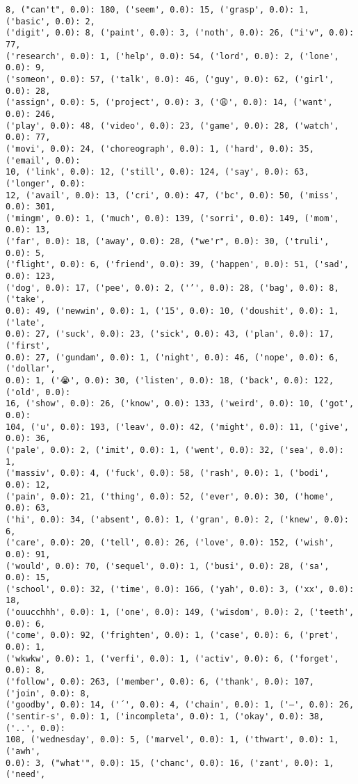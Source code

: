\documentclass[11pt]{article}
\begin{document}
\begin{Verbatim}[commandchars=\\\{\}]
8, ("can't", 0.0): 180, ('seem', 0.0): 15, ('grasp', 0.0): 1, ('basic', 0.0): 2,
('digit', 0.0): 8, ('paint', 0.0): 3, ('noth', 0.0): 26, ("i'v", 0.0): 77,
('research', 0.0): 1, ('help', 0.0): 54, ('lord', 0.0): 2, ('lone', 0.0): 9,
('someon', 0.0): 57, ('talk', 0.0): 46, ('guy', 0.0): 62, ('girl', 0.0): 28,
('assign', 0.0): 5, ('project', 0.0): 3, ('😩', 0.0): 14, ('want', 0.0): 246,
('play', 0.0): 48, ('video', 0.0): 23, ('game', 0.0): 28, ('watch', 0.0): 77,
('movi', 0.0): 24, ('choreograph', 0.0): 1, ('hard', 0.0): 35, ('email', 0.0):
10, ('link', 0.0): 12, ('still', 0.0): 124, ('say', 0.0): 63, ('longer', 0.0):
12, ('avail', 0.0): 13, ('cri', 0.0): 47, ('bc', 0.0): 50, ('miss', 0.0): 301,
('mingm', 0.0): 1, ('much', 0.0): 139, ('sorri', 0.0): 149, ('mom', 0.0): 13,
('far', 0.0): 18, ('away', 0.0): 28, ("we'r", 0.0): 30, ('truli', 0.0): 5,
('flight', 0.0): 6, ('friend', 0.0): 39, ('happen', 0.0): 51, ('sad', 0.0): 123,
('dog', 0.0): 17, ('pee', 0.0): 2, ('’', 0.0): 28, ('bag', 0.0): 8, ('take',
0.0): 49, ('newwin', 0.0): 1, ('15', 0.0): 10, ('doushit', 0.0): 1, ('late',
0.0): 27, ('suck', 0.0): 23, ('sick', 0.0): 43, ('plan', 0.0): 17, ('first',
0.0): 27, ('gundam', 0.0): 1, ('night', 0.0): 46, ('nope', 0.0): 6, ('dollar',
0.0): 1, ('😭', 0.0): 30, ('listen', 0.0): 18, ('back', 0.0): 122, ('old', 0.0):
16, ('show', 0.0): 26, ('know', 0.0): 133, ('weird', 0.0): 10, ('got', 0.0):
104, ('u', 0.0): 193, ('leav', 0.0): 42, ('might', 0.0): 11, ('give', 0.0): 36,
('pale', 0.0): 2, ('imit', 0.0): 1, ('went', 0.0): 32, ('sea', 0.0): 1,
('massiv', 0.0): 4, ('fuck', 0.0): 58, ('rash', 0.0): 1, ('bodi', 0.0): 12,
('pain', 0.0): 21, ('thing', 0.0): 52, ('ever', 0.0): 30, ('home', 0.0): 63,
('hi', 0.0): 34, ('absent', 0.0): 1, ('gran', 0.0): 2, ('knew', 0.0): 6,
('care', 0.0): 20, ('tell', 0.0): 26, ('love', 0.0): 152, ('wish', 0.0): 91,
('would', 0.0): 70, ('sequel', 0.0): 1, ('busi', 0.0): 28, ('sa', 0.0): 15,
('school', 0.0): 32, ('time', 0.0): 166, ('yah', 0.0): 3, ('xx', 0.0): 18,
('ouucchhh', 0.0): 1, ('one', 0.0): 149, ('wisdom', 0.0): 2, ('teeth', 0.0): 6,
('come', 0.0): 92, ('frighten', 0.0): 1, ('case', 0.0): 6, ('pret', 0.0): 1,
('wkwkw', 0.0): 1, ('verfi', 0.0): 1, ('activ', 0.0): 6, ('forget', 0.0): 8,
('follow', 0.0): 263, ('member', 0.0): 6, ('thank', 0.0): 107, ('join', 0.0): 8,
('goodby', 0.0): 14, ('´', 0.0): 4, ('chain', 0.0): 1, ('—', 0.0): 26,
('sentir-s', 0.0): 1, ('incompleta', 0.0): 1, ('okay', 0.0): 38, ('..', 0.0):
108, ('wednesday', 0.0): 5, ('marvel', 0.0): 1, ('thwart', 0.0): 1, ('awh',
0.0): 3, ("what'", 0.0): 15, ('chanc', 0.0): 16, ('zant', 0.0): 1, ('need',

\end{Verbatim}
\end{document}
